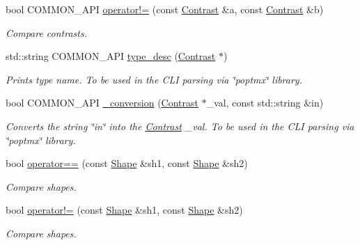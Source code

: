 \begin{DoxyCompactItemize}
bool COMMON\_\-API \hyperlink{group__Types_gaebd775321a5c08374eaed2b227b83552}{operator!=} (const \hyperlink{classContrast}{Contrast} \&a, const \hyperlink{classContrast}{Contrast} \&b)
\begin{DoxyCompactList}\small\item\em Compare contrasts. \item\end{DoxyCompactList}\item 
std::string COMMON\_\-API \hyperlink{group__Types_ga53ad0d300f418a34031d5efe90bc135f}{type\_\-desc} (\hyperlink{classContrast}{Contrast} $\ast$)
\begin{DoxyCompactList}\small\item\em Prints type name. To be used in the CLI parsing via \char`\"{}poptmx\char`\"{} library. \item\end{DoxyCompactList}\item 
bool COMMON\_\-API \hyperlink{group__Types_gaae619afb669156b36cccf8fff2fef8e7}{\_\-conversion} (\hyperlink{classContrast}{Contrast} $\ast$\_\-val, const std::string \&in)
\begin{DoxyCompactList}\small\item\em Converts the string \char`\"{}in\char`\"{} into the \hyperlink{classContrast}{Contrast} \_\-val. To be used in the CLI parsing via \char`\"{}poptmx\char`\"{} library. \item\end{DoxyCompactList}\item 
bool \hyperlink{group__Types_ga5a1faba4a4b00b4a0653a9912e53e9df}{operator==} (const \hyperlink{group__Types_ga777964671cb4315ce8c56c920db031e3}{Shape} \&sh1, const \hyperlink{group__Types_ga777964671cb4315ce8c56c920db031e3}{Shape} \&sh2)
\begin{DoxyCompactList}\small\item\em Compare shapes. \item\end{DoxyCompactList}\item 
bool \hyperlink{group__Types_ga8e62756e1934e51b8e405152892ab707}{operator!=} (const \hyperlink{group__Types_ga777964671cb4315ce8c56c920db031e3}{Shape} \&sh1, const \hyperlink{group__Types_ga777964671cb4315ce8c56c920db031e3}{Shape} \&sh2)
\begin{DoxyCompactList}\small\item\em Compare shapes. \item\end{DoxyCompactList}\end{DoxyCompactItemize}


